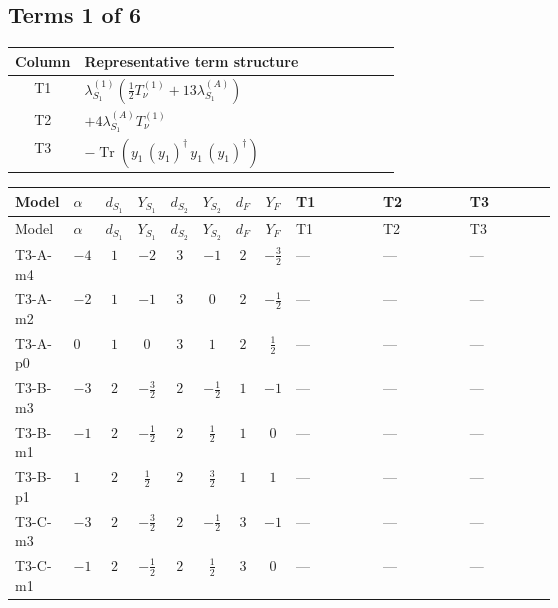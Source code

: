 \documentclass[8pt]{article}
\begin{document}
\begin{landscape}
\subsection*{Terms 1 of 6}
\begin{center}
\begin{tabular}{@{}c >{\raggedright\arraybackslash}p{0.82\linewidth}@{}}
\toprule
Column & Representative term structure \\
\midrule
T1 & \(\displaystyle {\lambda_{S_1}^{(1)}} \left(\frac{1}{2} T_{\nu}^{(1)}+13 {\lambda_{S_1}^{(A)}}\right)\) \\
\midrule
T2 & \(\displaystyle +4 {\lambda_{S_1}^{(A)}} T_{\nu}^{(1)}\) \\
\midrule
T3 & \(\displaystyle -\operatorname{Tr}\!\left({y_1}\,\left({y_1}\right)^{\dagger}\,{y_1}\,\left({y_1}\right)^{\dagger}\right)\) \\
\midrule
\bottomrule
\end{tabular}
\end{center}
\smallskip
\tiny
\begin{longtable}{@{}llcccccc >{\raggedright\arraybackslash}p{0.21\linewidth} >{\raggedright\arraybackslash}p{0.21\linewidth} >{\raggedright\arraybackslash}p{0.21\linewidth}@{}}
\toprule
Model & $\alpha$ & $d_{S_1}$ & $Y_{S_1}$ & $d_{S_2}$ & $Y_{S_2}$ & $d_F$ & $Y_F$ & T1 & T2 & T3 \\
\midrule
\endfirsthead
\toprule
Model & $\alpha$ & $d_{S_1}$ & $Y_{S_1}$ & $d_{S_2}$ & $Y_{S_2}$ & $d_F$ & $Y_F$ & T1 & T2 & T3 \\
\midrule
\endhead
T3-A-m4 & $-4$ & $1$ & $-2$ & $3$ & $-1$ & $2$ & $-\frac{3}{2}$ & --- & --- & --- \\
\midrule
T3-A-m2 & $-2$ & $1$ & $-1$ & $3$ & $0$ & $2$ & $-\frac{1}{2}$ & --- & --- & --- \\
\midrule
T3-A-p0 & $0$ & $1$ & $0$ & $3$ & $1$ & $2$ & $\frac{1}{2}$ & --- & --- & --- \\
\midrule
T3-B-m3 & $-3$ & $2$ & $-\frac{3}{2}$ & $2$ & $-\frac{1}{2}$ & $1$ & $-1$ & --- & --- & --- \\
\midrule
T3-B-m1 & $-1$ & $2$ & $-\frac{1}{2}$ & $2$ & $\frac{1}{2}$ & $1$ & $0$ & --- & --- & --- \\
\midrule
T3-B-p1 & $1$ & $2$ & $\frac{1}{2}$ & $2$ & $\frac{3}{2}$ & $1$ & $1$ & --- & --- & --- \\
\midrule
T3-C-m3 & $-3$ & $2$ & $-\frac{3}{2}$ & $2$ & $-\frac{1}{2}$ & $3$ & $-1$ & --- & --- & --- \\
\midrule
T3-C-m1 & $-1$ & $2$ & $-\frac{1}{2}$ & $2$ & $\frac{1}{2}$ & $3$ & $0$ & --- & --- & --- \\

\end{longtable}
\end{landscape}
\end{document}
